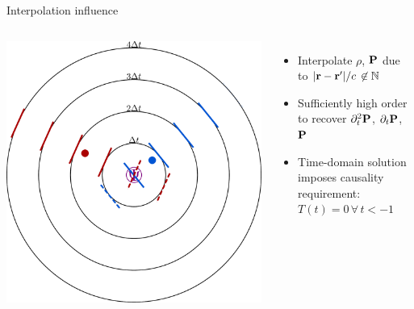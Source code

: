 \documentclass[aspectratio=169, usenames, dvipsnames]{beamer}
\begin{document}
\begin{frame}{Interpolation influence}
  \begin{columns}
      \begin{center}
        \includegraphics[height=0.85\textheight]{figures/spheres_of_influence}
      \end{center}

      \begin{itemize}
        \item Interpolate $\rho$, $\vb{P}$ due to $\abs{\vb{r} - \vb{r}'}/c \, \not \in \mathbb{N}$
        \item Sufficiently high order to recover $\partial_t^2 \vb{P}$, $\partial_t \vb{P}$, $\vb{P}$
        \item Time-domain solution imposes causality requirement: $T(t) = 0 \, \forall \, t < -1$
      \end{itemize}
  \end{columns}
\end{frame}
\end{document}

